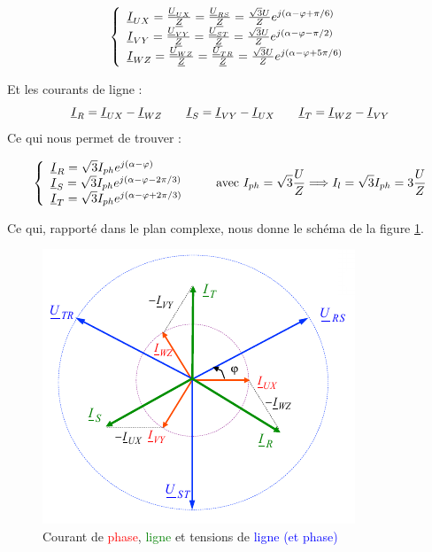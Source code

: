 \documentclass[12pt,a4paper]{article}
\newcommand{\uz}{\uline{Z} }
\newcommand{\ui}{\uline{I} }
\newcommand{\uu}{\uline{U} }
\begin{document}
\begin{equation*}
	\left\{\begin{array}{l}
		\ui_{UX} = \frac{\uu_{UX}}{\uz} = \frac{\uu_{RS}}{\uz} = \frac{\sqrt{3}U}{Z}e^{j(\alpha - \varphi + \pi/6)}\\
		\ui_{VY} = \frac{\uu_{VY}}{\uz} = \frac{\uu_{ST}}{\uz} = \frac{\sqrt{3}U}{Z}e^{j(\alpha - \varphi - \pi/2)}\\
	\ui_{WZ} = \frac{\uu_{WZ}}{\uz} = \frac{\uu_{TR}}{\uz} = \frac{\sqrt{3}U}{Z}e^{j(\alpha - \varphi + 5\pi/6)}
\end{array}\right.
\end{equation*}

Et les courants de ligne : 
\begin{equation*}
	\ui_R = \ui_{UX} - \ui_{WZ} \qquad \ui_S = \ui_{VY} - \ui_{UX} \qquad \ui_T = \ui_{WZ} - \ui_{VY}
\end{equation*}
Ce qui nous permet de trouver :

\begin{equation}
	\left\{\begin{array}{l}
		\ui_R = \sqrt{3}I_{ph}e^{j(\alpha-\varphi)}\\
		\ui_S = \sqrt{3}I_{ph}e^{j(\alpha-\varphi - 2\pi/3)}\\
		\ui_T = \sqrt{3}I_{ph}e^{j(\alpha-\varphi + 2\pi/3)}\\
	\end{array} \right. \qquad \text{avec } I_{ph} = \sqrt{3}\frac{U}{Z} \Longrightarrow I_l = \sqrt{3}I_{ph} = 3\frac{U}{Z}
\end{equation}

Ce qui, rapporté dans le plan complexe, nous donne le schéma de la figure \ref{fig: courant triangle}.
\begin{figure}
	\centering
	\includegraphics[scale=0.6]{images/phaseur_courant_triangle}
	\caption{Courant de \textcolor{red}{phase}, \textcolor{green}{ligne} et tensions de \textcolor{blue}{ligne (et phase)}}
	\label{fig: courant triangle}
\end{figure}
\end{document}
